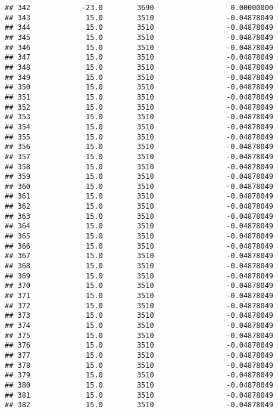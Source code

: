 \documentclass[]{article}
\begin{document}
\begin{verbatim}
## 342            -23.0        3690                  0.00000000
## 343             15.0        3510                 -0.04878049
## 344             15.0        3510                 -0.04878049
## 345             15.0        3510                 -0.04878049
## 346             15.0        3510                 -0.04878049
## 347             15.0        3510                 -0.04878049
## 348             15.0        3510                 -0.04878049
## 349             15.0        3510                 -0.04878049
## 350             15.0        3510                 -0.04878049
## 351             15.0        3510                 -0.04878049
## 352             15.0        3510                 -0.04878049
## 353             15.0        3510                 -0.04878049
## 354             15.0        3510                 -0.04878049
## 355             15.0        3510                 -0.04878049
## 356             15.0        3510                 -0.04878049
## 357             15.0        3510                 -0.04878049
## 358             15.0        3510                 -0.04878049
## 359             15.0        3510                 -0.04878049
## 360             15.0        3510                 -0.04878049
## 361             15.0        3510                 -0.04878049
## 362             15.0        3510                 -0.04878049
## 363             15.0        3510                 -0.04878049
## 364             15.0        3510                 -0.04878049
## 365             15.0        3510                 -0.04878049
## 366             15.0        3510                 -0.04878049
## 367             15.0        3510                 -0.04878049
## 368             15.0        3510                 -0.04878049
## 369             15.0        3510                 -0.04878049
## 370             15.0        3510                 -0.04878049
## 371             15.0        3510                 -0.04878049
## 372             15.0        3510                 -0.04878049
## 373             15.0        3510                 -0.04878049
## 374             15.0        3510                 -0.04878049
## 375             15.0        3510                 -0.04878049
## 376             15.0        3510                 -0.04878049
## 377             15.0        3510                 -0.04878049
## 378             15.0        3510                 -0.04878049
## 379             15.0        3510                 -0.04878049
## 380             15.0        3510                 -0.04878049
## 381             15.0        3510                 -0.04878049
## 382             15.0        3510                 -0.04878049

\end{verbatim}
\end{document}
